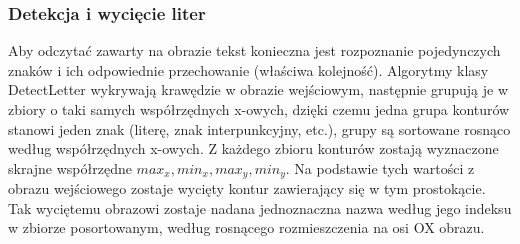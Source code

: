 \documentclass[a4paper,12pt]{article}
\newcommand\spacingIndent{2.2em}
\begin{document}
        \subsubsection{Detekcja i wycięcie liter}
            \hspace{\spacingIndent} Aby odczytać zawarty na obrazie tekst konieczna jest rozpoznanie pojedynczych znaków i ich odpowiednie przechowanie (właściwa kolejność).            Algorytmy klasy DetectLetter wykrywają krawędzie w obrazie wejściowym,     następnie grupują je w zbiory o taki samych współrzędnych x-owych, dzięki    czemu jedna grupa konturów stanowi jeden znak (literę, znak                 interpunkcyjny, etc.), grupy są sortowane rosnąco według współrzędnych      x-owych. Z każdego zbioru konturów zostają wyznaczone skrajne współrzędne    $ max_{x} , min_{x}, max_{y}, min_{y} $. Na podstawie tych wartości z       obrazu wejściowego zostaje wycięty kontur zawierający się w tym             prostokącie. Tak wyciętemu obrazowi zostaje nadana jednoznaczna nazwa       według jego indeksu w zbiorze posortowanym, według rosnącego rozmieszczenia na osi OX obrazu. 
    
\end{document}
